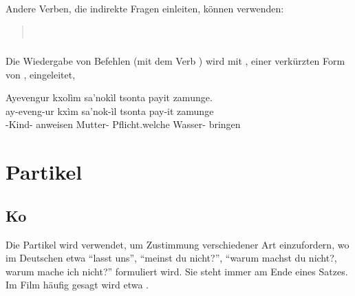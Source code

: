 \subsubsection{} Andere Verben, die indirekte Fragen einleiten, können  verwenden:

\begin{quotation}
	\noindent{}  \\
	\noindent{} 
\end{quotation}

\subsubsection{} Die Wiedergabe von Befehlen (mit dem Verb  ) wird mit , einer verkürzten Form von  , eingeleitet,

\begin{interlin}
	\glll Ayevengur kxolìm sa'nokìl tsonta payit zamunge. \\
	ay-eveng-ur kxìm sa'nok-ìl tsonta pay-it zamunge \\
	-Kind- anweisen Mutter- Pflicht.welche Wasser- bringen \\
	 \Ipawl{}
\end{interlin}

\noindent{}

\section{Partikel}

\subsection{Ko} Die Partikel  wird verwendet, um Zustimmung verschiedener Art einzufordern, wo im Deutschen etwa ``lasst uns'', ``meinst du nicht?'', ``warum machst du nicht?, warum mache ich nicht?'' formuliert wird. Sie steht immer am Ende eines Satzes. Im Film häufig gesagt wird etwa  .
\label{syn:particle:ko}

